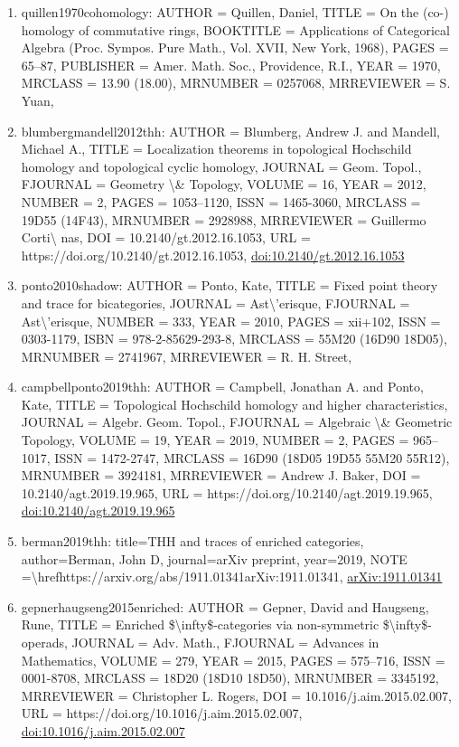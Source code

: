 \documentclass[11pt]{article}
\begin{document}
\begin{enumerate}[leftmargin=*]
  \item quillen1970cohomology: AUTHOR = Quillen, Daniel, TITLE = On the (co-) homology of commutative rings, BOOKTITLE = Applications of Categorical Algebra (Proc. Sympos. Pure Math., Vol. XVII, New York, 1968), PAGES = 65--87, PUBLISHER = Amer. Math. Soc., Providence, R.I., YEAR = 1970, MRCLASS = 13.90 (18.00), MRNUMBER = 0257068, MRREVIEWER = S. Yuan,
  \item blumbergmandell2012thh: AUTHOR = Blumberg, Andrew J. and Mandell, Michael A., TITLE = Localization theorems in topological Hochschild homology and topological cyclic homology, JOURNAL = Geom. Topol., FJOURNAL = Geometry \textbackslash{}\& Topology, VOLUME = 16, YEAR = 2012, NUMBER = 2, PAGES = 1053--1120, ISSN = 1465-3060, MRCLASS = 19D55 (14F43), MRNUMBER = 2928988, MRREVIEWER = Guillermo Corti\textbackslash{} nas, DOI = 10.2140/gt.2012.16.1053, URL = https://doi.org/10.2140/gt.2012.16.1053, \href{https://doi.org/10.2140/gt.2012.16.1053}{doi:10.2140/gt.2012.16.1053}
  \item ponto2010shadow: AUTHOR = Ponto, Kate, TITLE = Fixed point theory and trace for bicategories, JOURNAL = Ast\textbackslash{}'erisque, FJOURNAL = Ast\textbackslash{}'erisque, NUMBER = 333, YEAR = 2010, PAGES = xii+102, ISSN = 0303-1179, ISBN = 978-2-85629-293-8, MRCLASS = 55M20 (16D90 18D05), MRNUMBER = 2741967, MRREVIEWER = R. H. Street,
  \item campbellponto2019thh: AUTHOR = Campbell, Jonathan A. and Ponto, Kate, TITLE = Topological Hochschild homology and higher characteristics, JOURNAL = Algebr. Geom. Topol., FJOURNAL = Algebraic \textbackslash{}\& Geometric Topology, VOLUME = 19, YEAR = 2019, NUMBER = 2, PAGES = 965--1017, ISSN = 1472-2747, MRCLASS = 16D90 (18D05 19D55 55M20 55R12), MRNUMBER = 3924181, MRREVIEWER = Andrew J. Baker, DOI = 10.2140/agt.2019.19.965, URL = https://doi.org/10.2140/agt.2019.19.965, \href{https://doi.org/10.2140/agt.2019.19.965}{doi:10.2140/agt.2019.19.965}
  \item berman2019thh: title=THH and traces of enriched categories, author=Berman, John D, journal=arXiv preprint, year=2019, NOTE =\textbackslash{}hrefhttps://arxiv.org/abs/1911.01341arXiv:1911.01341, \href{https://arxiv.org/abs/1911.01341}{arXiv:1911.01341}
  \item gepnerhaugseng2015enriched: AUTHOR = Gepner, David and Haugseng, Rune, TITLE = Enriched \$\textbackslash{}infty\$-categories via non-symmetric \$\textbackslash{}infty\$-operads, JOURNAL = Adv. Math., FJOURNAL = Advances in Mathematics, VOLUME = 279, YEAR = 2015, PAGES = 575--716, ISSN = 0001-8708, MRCLASS = 18D20 (18D10 18D50), MRNUMBER = 3345192, MRREVIEWER = Christopher L. Rogers, DOI = 10.1016/j.aim.2015.02.007, URL = https://doi.org/10.1016/j.aim.2015.02.007, \href{https://doi.org/10.1016/j.aim.2015.02.007}{doi:10.1016/j.aim.2015.02.007}

\end{enumerate}
\end{document}
